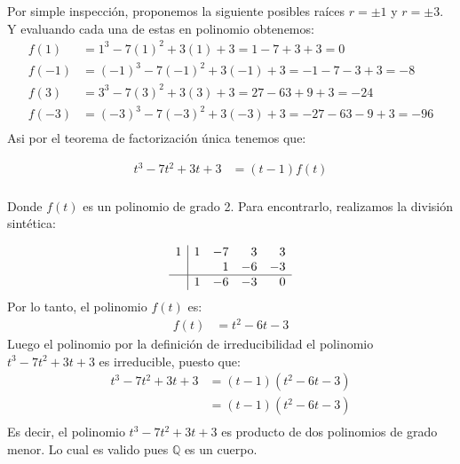 \begin{solution}
    Por simple inspección, proponemos la siguiente posibles raíces $r=\pm 1$ y $r=\pm 3$. Y evaluando cada una de estas en polinomio obtenemos:
    \begin{align*}
    f(1) &= 1^3 - 7(1)^2 + 3(1) + 3 = 1 - 7 + 3 + 3 = 0 \\
    f(-1) &= (-1)^3 - 7(-1)^2 + 3(-1) + 3 = -1 - 7 - 3 + 3 = -8 \\
    f(3) &= 3^3 - 7(3)^2 + 3(3) + 3 = 27 - 63 + 9 + 3 = -24 \\
    f(-3) &= (-3)^3 - 7(-3)^2 + 3(-3) + 3 = -27 - 63 - 9 + 3 = -96 \\
    \end{align*}
    Asi por el teorema de factorización única tenemos que:

    \begin{align*}
        t^3 - 7t^2 + 3t + 3 &= (t-1)f(t) \\
    \end{align*}

    Donde $f(t)$ es un polinomio de grado 2. Para encontrarlo, realizamos la división sintética:

    \begin{align*}
        \begin{array}{r|rrrr}
            1 & 1 & -7 & 3 & 3 \\
              &   & 1 & -6 & -3 \\
            \hline
              & 1 & -6 & -3 & 0 \\
        \end{array}
    \end{align*}
    Por lo tanto, el polinomio $f(t)$ es:
    \begin{align*}
        f(t) &= t^2 - 6t - 3
    \end{align*}
    Luego el polinomio por la definición de irreducibilidad el polinomio $t^3 - 7t^2 + 3t + 3$ es irreducible, puesto que:
    \begin{align*}
        t^3 - 7t^2 + 3t + 3 &= (t-1)(t^2 - 6t - 3) \\
        &= (t-1)(t^2 - 6t - 3) \\
    \end{align*}
    Es decir, el polinomio $t^3 - 7t^2 + 3t + 3$ es producto de dos polinomios de grado menor. Lo cual es valido pues $\mathbb Q$ es un cuerpo.
\end{solution}